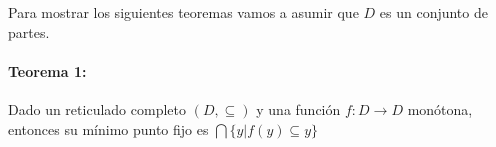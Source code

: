 Para mostrar los siguientes teoremas vamos a asumir que $D$ es un conjunto de partes.

\paragraph{Teorema 1:} Dado un reticulado completo $(D, \subseteq)$ y una función $f:D\to D$ monótona, entonces su mínimo punto fijo es $\bigcap\{ y | f(y) \subseteq y\}$


%
%

